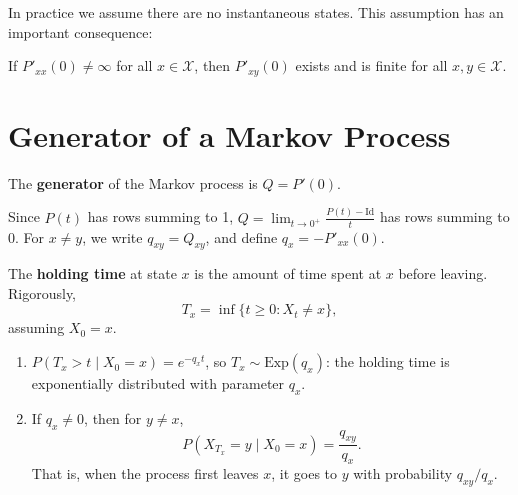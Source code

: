 \documentclass{ximera}
\begin{document}
In practice we assume there are no instantaneous states. This assumption has an important consequence:

\begin{proposition}
If $P'_{xx}(0) \neq \infty$ for all $x \in \mathcal{X}$, then $P'_{xy}(0)$ exists and is finite for all $x, y \in \mathcal{X}$.
\end{proposition}

\section*{Generator of a Markov Process}

\begin{definition}
The \textbf{generator} of the Markov process is $Q = P'(0)$.
\end{definition}

Since $P(t)$ has rows summing to 1, $Q = \lim_{t \to 0^+} \frac{P(t) - \text{Id}}{t}$ has rows summing to 0. For $x \neq y$, we write $q_{xy} = Q_{xy}$, and define $q_x = -P'_{xx}(0)$.

\begin{definition}
The \textbf{holding time} at state $x$ is the amount of time spent at $x$ before leaving. Rigorously,
\[
T_x = \inf\{t \geq 0 : X_t \neq x\},
\]
assuming $X_0 = x$.
\end{definition}

\begin{proposition}
\begin{enumerate}[label=(\arabic*)]
\item $P(T_x > t \mid X_0 = x) = e^{-q_x t}$, so $T_x \sim \text{Exp}(q_x)$: the holding time is exponentially distributed with parameter $q_x$.
\item If $q_x \neq 0$, then for $y \neq x$,
\[
P(X_{T_x} = y \mid X_0 = x) = \frac{q_{xy}}{q_x}.
\]
That is, when the process first leaves $x$, it goes to $y$ with probability $q_{xy}/q_x$.
\end{enumerate}
\end{proposition}
\end{document}
